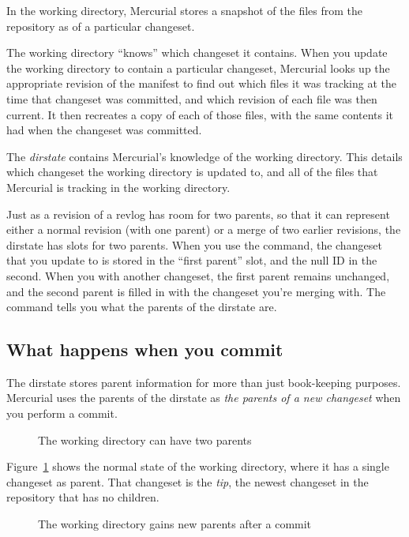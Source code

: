 In the working directory, Mercurial stores a snapshot of the files
from the repository as of a particular changeset.

The working directory ``knows'' which changeset it contains.  When you
update the working directory to contain a particular changeset,
Mercurial looks up the appropriate revision of the manifest to find
out which files it was tracking at the time that changeset was
committed, and which revision of each file was then current.  It then
recreates a copy of each of those files, with the same contents it had
when the changeset was committed.

The \emph{dirstate} contains Mercurial's knowledge of the working
directory.  This details which changeset the working directory is
updated to, and all of the files that Mercurial is tracking in the
working directory.

Just as a revision of a revlog has room for two parents, so that it
can represent either a normal revision (with one parent) or a merge of
two earlier revisions, the dirstate has slots for two parents.  When
you use the  command, the changeset that you update to
is stored in the ``first parent'' slot, and the null ID in the second.
When you  with another changeset, the first parent
remains unchanged, and the second parent is filled in with the
changeset you're merging with.  The  command tells you
what the parents of the dirstate are.

\subsection{What happens when you commit}

The dirstate stores parent information for more than just book-keeping
purposes.  Mercurial uses the parents of the dirstate as \emph{the
  parents of a new changeset} when you perform a commit.

\begin{figure}[ht]
  \centering
  \caption{The working directory can have two parents}
  \label{fig:concepts:wdir}
\end{figure}

Figure~\ref{fig:concepts:wdir} shows the normal state of the working
directory, where it has a single changeset as parent.  That changeset
is the \emph{tip}, the newest changeset in the repository that has no
children.

\begin{figure}[ht]
  \centering
  \caption{The working directory gains new parents after a commit}
  \label{fig:concepts:wdir-after-commit}
\end{figure}

